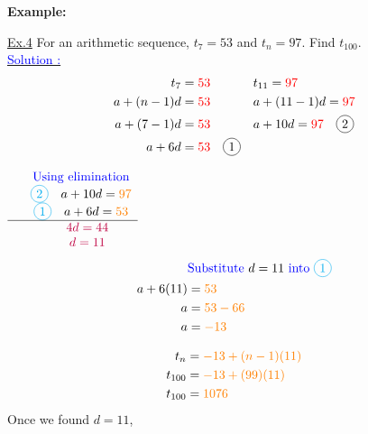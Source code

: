 \documentclass[12pt,a4paper]{article}
\newcommand*\circled[1]{\tikz[baseline=(char.base)]{
            \node[shape=circle,draw,inner sep=2pt] (char) {#1};}}
\newenvironment{example}
  {\begin{framed}\colorbox{examplecolor}{
  \parbox{\dimexpr\linewidth-2\fboxsep}{
  \textbf{Example:}}}}
  {\end{framed}}
\begin{document}
\begin{example}
    \underline{Ex.4} For an arithmetic sequence, $t_7=53$ and $t_n=97$. Find $t_{100}$.\\
    \underline{\textcolor{blue}{Solution \circled{1} :}}
    \begin{align*}
        t_7 &= \textcolor{red}{53} \quad && t_{11} = \textcolor{red}{97}  \\
        a + (n-1)d &= \textcolor{red}{53} \quad && a + (11-1)d = \textcolor{red}{97}  \\
        a + (7-1)d &= \textcolor{red}{53} \quad && a + 10d = \textcolor{red}{97} \quad \circled{2} \\
        a + 6d &= \textcolor{red}{53} \quad \circled{1}
    \end{align*}
  \begin{minipage}[t]{0.48\textwidth}
        $\begin{array}{ccccc}
             & \textcolor{blue}{\text{Using elimination}} \\
             & \textcolor{cyan}{\circled{2}} \quad a + 10d = \textcolor{orange}{97} \\
             & \textcolor{cyan}{\circled{1}} \quad a + 6d = \textcolor{orange}{53} \\
             \hline \
             & \quad \textcolor{purple}{4d = 44} \\
             & \quad \textcolor{purple}{d = 11}
        \end{array}$
        \begin{align*}
            &\textcolor{blue}{\text{Substitute }} d=11 \textcolor{blue}{\text{ into }} \textcolor{cyan}{\circled{1}} \\
            a + 6(11) &= \textcolor{orange}{53} \\
            a &= \textcolor{orange}{53 - 66} \\
            a &= \textcolor{orange}{-13}
        \end{align*}
    \end{minipage}%
    \begin{minipage}[t]{0.48\textwidth}
        \begin{align*}
            t_n &= \textcolor{orange}{-13 + (n-1)(11)} \\
            t_{100} &= \textcolor{orange}{-13 + (99)(11)} \\
            t_{100} &= \textcolor{orange}{1076} \\
        \end{align*}
        Once we found $d=11$,

\end{minipage}
\end{example}
\end{document}
